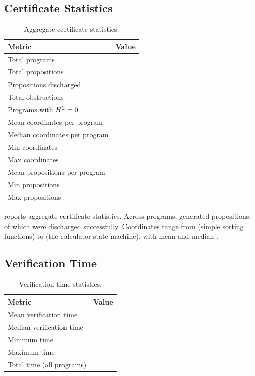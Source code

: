 \documentclass[11pt]{article}
\begin{document}
\subsection{Certificate Statistics}

\begin{table}[t]
\centering
\caption{Aggregate certificate statistics.}
\label{tab:cert-stats}
\small
\begin{tabular}{@{}lr@{}}
\toprule
\textbf{Metric} & \textbf{Value} \\
\midrule
Total programs & \expTotalPrograms{} \\
Total propositions & \expPropsSum{} \\
Propositions discharged & \expPropsOkSum{} \\
Total obstructions & \expObstructionTotal{} \\
Programs with $H^{1} = 0$ & \expHOneZero{} \\
Mean coordinates per program & \expCoordsMean{} \\
Median coordinates per program & \expCoordsMedian{} \\
Min coordinates & \expCoordsMin{} \\
Max coordinates & \expCoordsMax{} \\
Mean propositions per program & \expPropsMean{} \\
Min propositions & \expPropsMin{} \\
Max propositions & \expPropsMax{} \\
\bottomrule
\end{tabular}
\end{table}

 reports aggregate certificate statistics.
Across \expTotalPrograms{} programs, \JuGeo{} generated
\expPropsSum{} propositions, of which \expPropsOkSum{} were
discharged successfully.  Coordinates range from \expCoordsMin{}
(simple sorting functions) to \expCoordsMax{} (the calculator
state machine), with mean \expCoordsMean{} and median
\expCoordsMedian{}.

\subsection{Verification Time}

\begin{table}[t]
\centering
\caption{Verification time statistics.}
\label{tab:time-stats}
\small
\begin{tabular}{@{}lr@{}}
\toprule
\textbf{Metric} & \textbf{Value} \\
\midrule
Mean verification time & \expTimeMean{} \\
Median verification time & \expTimeMedian{} \\
Minimum time & \expTimeMin{} \\
Maximum time & \expTimeMax{} \\
Total time (all programs) & \expTimeTotal{} \\
\bottomrule
\end{tabular}
\end{table}
\end{document}
